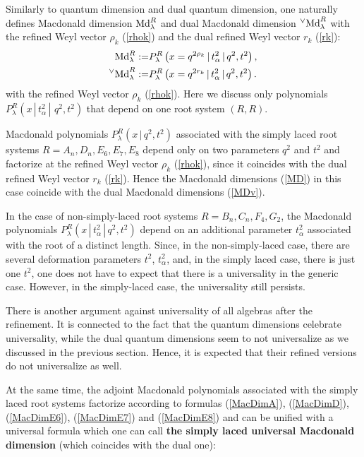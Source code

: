 \documentclass{article}
\def\MD{\hbox{Md}}%
\def\dMD{{^\vee\hbox{Md}}}
\def\MD{\hbox{Md}}%
\def\dMD{{^\vee\hbox{Md}}}
\begin{document}
Similarly to quantum dimension and dual quantum dimension, one naturally defines { Macdonald dimension} $\MD^R_{\lambda}$ and dual Macdonald dimension $\dMD_{\lambda}^{R}$ with the refined Weyl vector $\rho_k$ (\ref{rhok}) and the dual refined Weyl vector $r_k$ (\ref{rk}):
\begin{align}
    \MD^R_{\lambda}:= &P^{R}_{\lambda}\left(x = q^{2\rho_k}\,|\,t_\alpha^2\,|\,q^2,t^2\right), \label{MD}\\
    \dMD_{\lambda}^{R} := &P^{R}_{\lambda}\left(x = q^{2r_k}\,|\, t_{\alpha}^2\,|\, q^2, t^2 \right) \label{MDv}.
\end{align}
with the refined Weyl vector $\rho_k$ (\ref{rhok}). Here we discuss only  polynomials $P^{R}_{\lambda} (x\,|\,t_{\alpha}^2\,|\,\,q^2,t^2)$ that depend on one root system $(R,R)$.

Macdonald polynomials $ P^{R}_{\lambda}(x\,|\, q^2, t^2)$ associated with the simply laced root systems $R = A_n, D_n, E_6, E_7, E_8$  depend only on two parameters $q^2$ and $t^2$ and factorize at the refined Weyl vector $\rho_k$ (\ref{rhok}), since it coincides with the dual refined Weyl vector $r_k$ (\ref{rk}). Hence the Macdonald dimensions (\ref{MD}) in this case coincide with the dual Macdonald dimensions (\ref{MDv}).

In the case of non-simply-laced root systems $R = B_n,C_n,F_4,G_2$, the Macdonald polynomials $P^{R}_{\lambda}(x\,|\,t_{\alpha}^2\,|\,q^2,t^2)$  depend on an additional parameter $t_{\alpha}^2$ associated with the root of a distinct length.  Since, in the non-simply-laced case, there are several deformation parameters $t^2$, $t_{\alpha}^2$, and, in the simply laced case, there is just one $t^2$, one does not have to expect that there is a universality in the generic case. However, in the simply-laced case, the universality still persists.

There is another argument against universality of all algebras after the refinement. It is connected to the fact that the quantum dimensions celebrate universality, while the dual quantum dimensions seem to not universalize as we discussed in the previous section. Hence, it is expected that their refined versions do not universalize as well.

At the same time, the adjoint Macdonald polynomials associated with the simply laced root systems factorize according to formulas  (\ref{MacDimA}), (\ref{MacDimD}), (\ref{MacDimE6}), (\ref{MacDimE7}) and  (\ref{MacDimE8}) and can be unified with a universal formula which one can call {\bf the simply laced universal Macdonald dimension} (which coincides with the dual one):
\end{document}

